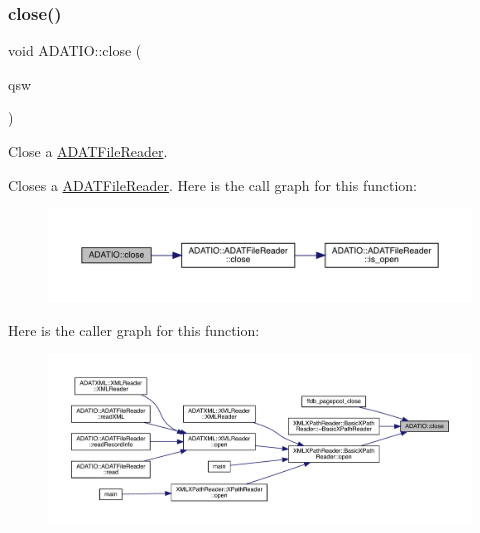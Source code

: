 \subsubsection{\texorpdfstring{close()}{close()}\hspace{0.1cm}{\footnotesize\ttfamily [2/2]}}
{\footnotesize\ttfamily void A\+D\+A\+T\+I\+O\+::close (\begin{DoxyParamCaption}\item[{\mbox{\hyperlink{classADATIO_1_1ADATFileReader}{A\+D\+A\+T\+File\+Reader}} \&}]{qsw }\end{DoxyParamCaption})}



Close a \mbox{\hyperlink{classADATIO_1_1ADATFileReader}{A\+D\+A\+T\+File\+Reader}}. 

Closes a \mbox{\hyperlink{classADATIO_1_1ADATFileReader}{A\+D\+A\+T\+File\+Reader}}. Here is the call graph for this function\+:\nopagebreak
\begin{figure}[H]
\begin{center}
\leavevmode
\includegraphics[width=350pt]{db/de5/group__qio_gac32c771b58d87e4ef4af62a7ad2e5c0d_cgraph}
\end{center}
\end{figure}
Here is the caller graph for this function\+:\nopagebreak
\begin{figure}[H]
\begin{center}
\leavevmode
\includegraphics[width=350pt]{db/de5/group__qio_gac32c771b58d87e4ef4af62a7ad2e5c0d_icgraph}
\end{center}
\end{figure}
\mbox{\label{group__qio_ga22337f3cfe1b2ecd1ead8d2755a1f9ca}} 
